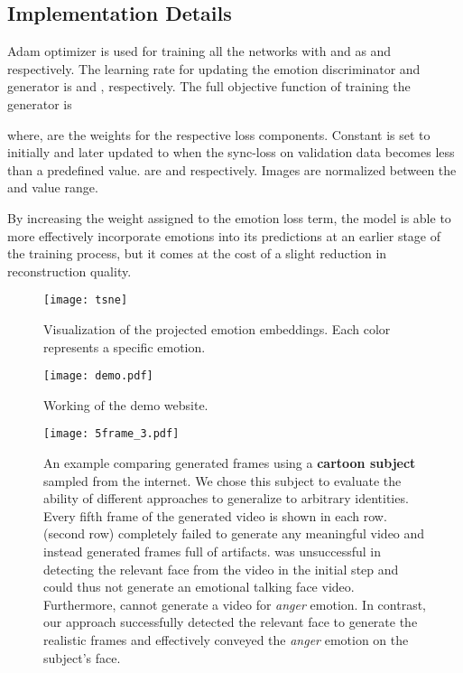 \documentclass[accepted]{uai2023}
\begin{document}
\subsection{Implementation Details}
Adam optimizer \citep{duchi2011adaptive} is used for training all the networks with  and  as  and  respectively. The learning rate for updating the emotion discriminator and generator is  and , respectively. The full objective function of training the generator is

where,  are the weights for the respective loss components.
Constant  is set to  initially and later updated to  when the sync-loss on validation data becomes less than a predefined value.  are  and  respectively. Images are normalized between the  and  value range.  

By increasing the weight assigned to the emotion loss term, the model is able to more effectively incorporate emotions into its predictions at an earlier stage of the training process, but it comes at the cost of a slight reduction in reconstruction quality.

 \begin{figure}[htp]
    \centering
    \texttt{[image: tsne]}
    \caption{Visualization of the projected emotion embeddings. Each color represents a specific emotion.}
    \label{fig:tsne}
\end{figure}

\begin{figure}[htp]
\texttt{[image: demo.pdf]}
\caption{Working of the demo website.}
\label{fig:demo}
\end{figure}

\begin{figure*}[htp]
\texttt{[image: 5frame\_3.pdf]}
\caption{An example comparing generated frames using a \textbf{cartoon subject} sampled from the internet. We chose this subject to evaluate the ability of different approaches to generalize to arbitrary identities. Every fifth frame of the generated video is shown in each row. \citet{wang2021audio2head} (second row) completely failed to generate any meaningful video and instead generated frames full of artifacts. \cite{9496264} was unsuccessful in detecting the relevant face from the video in the initial step and could thus not generate an emotional talking face video. Furthermore, \citet{magnusson2021invertable} cannot generate a video for \emph{anger} emotion.
In contrast, our approach {} successfully detected the relevant face to generate the realistic frames and effectively conveyed the \emph{anger} emotion on the subject's face.}
\label{fig:cmp2}
\end{figure*}
\end{document}
